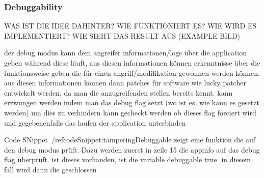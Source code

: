 \subsubsection{Debuggability} \label{subsection:section:counter-improve-tampering-debuggable}
WAS IST DIE IDEE DAHINTER? WIE FUNKTIONIERT ES? WIE WIRD ES IMPLEMENTIERT? WIE SIEHT DAS RESULT AUS (EXAMPLE BILD)\newline

der debug modus kann dem angreifer informationen/logs über die application geben während diese läuft, aus diesen informationen können erkenntnisse über die funktionsweise geben die für einen angriff/modifikation gewonnen werden können. aus diesen informationen können dann patches für software wie lucky patcher entwickelt werden, da man die anzugreifenden stellen bereits kennt.
kann erzwungen werden indem man das debug flag setzt (wo ist es, wie kann es gesetzt werden)\newline
um dies zu verhindern kann gecheckt werden ob dieses flag forciert wird und gegebenenfalls das laufen der application unterbinden\newline



 Code SNippet~/ref{codeSnippet:tamperingDebuggable} zeigt eine funktion die auf den debug modus prüft. Dazu werden zuerst in zeile 15 die appinfo auf das debug flag überprüft. ist dieses vorhanden, ist die variable debuggable true. in diesem fall wird dann die geschlossen\newline
